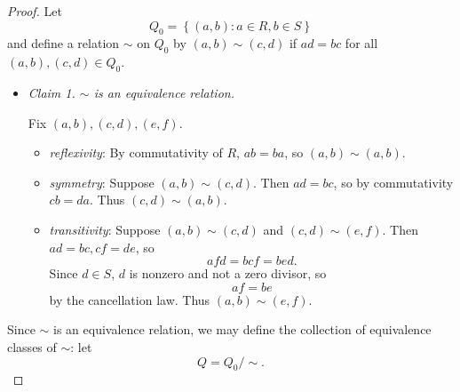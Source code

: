 \documentclass[pmath347]{subfiles}
\begin{document}
    \begin{proof}
        Let
        \begin{equation*}
            Q_0 = \left\lbrace \left( a,b \right) : a\in R, b\in S \right\rbrace 
        \end{equation*}
        and define a relation $\sim$ on $Q_0$ by $\left( a,b \right) \sim \left( c,d \right)$ if $ad=bc$ for all $\left( a,b \right) , \left( c,d \right) \in Q_0$.
        \begin{itemize}
            \item \textit{Claim 1. $\sim$ is an equivalence relation.}

                \begin{subproof}
                    Fix $\left( a,b \right) , \left( c,d \right) , \left( e,f \right)$. 
                    \begin{itemize}
                        \item \textit{reflexivity}: By commutativity of $R$, $ab=ba$, so $\left( a,b \right) \sim \left( a,b \right)$.
                        \item \textit{symmetry}: Suppose $\left( a,b \right) \sim \left( c,d \right)$. Then $ad=bc$, so by commutativity $cb=da$. Thus $\left( c,d \right) \sim \left( a,b \right)$.
                        \item \textit{transitivity}: Suppose $\left( a,b \right) \sim \left( c,d \right)$ and $\left( c,d \right) \sim \left( e,f \right)$. Then $ad=bc, cf=de$, so
                            \begin{equation*}
                                afd = bcf = bed.
                            \end{equation*}
                            Since $d\in S$, $d$ is nonzero and not a zero divisor, so
                            \begin{equation*}
                                af = be
                            \end{equation*}
                            by the cancellation law. Thus $\left( a,b \right) \sim \left( e,f \right)$.\qqqedsym
                    \end{itemize} 
                \end{subproof}
        \end{itemize} 
        Since $\sim$ is an equivalence relation, we may define the collection of equivalence classes of $\sim$: let
        \begin{equation*}
            Q = Q_0 /\sim.
        \end{equation*}

\end{proof}
\end{document}

